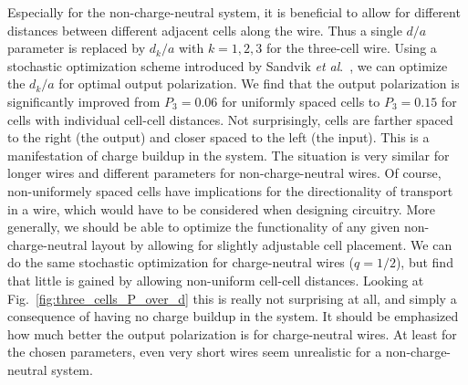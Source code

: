 Especially for the non-charge-neutral system, it is beneficial to allow for
different distances between different adjacent cells along the wire. Thus a
single $d/a$ parameter is replaced by $d_k/a$ with $k = 1,2,3$ for the
three-cell wire. Using a stochastic optimization scheme introduced by Sandvik
\emph{et al}.\ \cite{Sandvik2007}, we can optimize the $d_k/a$ for optimal
output polarization. We find that the output polarization is significantly
improved from $P_3 = 0.06$ for uniformly spaced cells to $P_3 = 0.15$ for cells
with individual cell-cell distances. Not surprisingly, cells are farther spaced
to the right (the output) and closer spaced to the left (the input). This is a
manifestation of charge buildup in the system. The situation is very similar for
longer wires and different parameters for non-charge-neutral wires. Of course,
non-uniformely spaced cells have implications for the directionality of
transport in a wire, which would have to be considered when designing 
circuitry. More generally, we should be able to optimize the functionality of
any given non-charge-neutral  layout by allowing for slightly
adjustable cell placement. We can do the same stochastic optimization for
charge-neutral wires ($q=1/2$), but find that little is gained by allowing
non-uniform cell-cell distances. Looking at Fig.~\ref{fig:three_cells_P_over_d}
this is really not surprising at all, and simply a consequence of having no
charge buildup in the system. It should be emphasized how much better the output
polarization is for charge-neutral wires. At least for the chosen parameters,
even very short wires seem unrealistic for a non-charge-neutral system.

